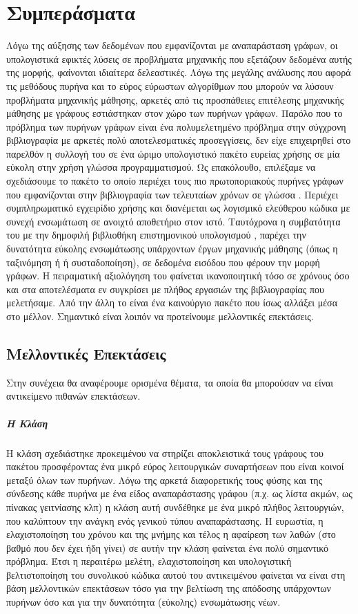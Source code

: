\chapter{Συμπεράσματα}
\label{chap5}
Λόγω της αύξησης των δεδομένων που εμφανίζονται με αναπαράσταση γράφων, οι υπολογιστικά εφικτές λύσεις σε προβλήματα μηχανικής που εξετάζουν δεδομένα αυτής της μορφής, φαίνονται ιδιαίτερα δελεαστικές.
Λόγω της μεγάλης ανάλυσης που αφορά τις μεθόδους πυρήνα και το εύρος εύρωστων αλγορίθμων που μπορούν να λύσουν προβλήματα μηχανικής μάθησης, αρκετές από τις προσπάθειες επιτέλεσης μηχανικής μάθησης με γράφους εστιάστηκαν στον χώρο των πυρήνων γράφων.
Παρόλο που το πρόβλημα των πυρήνων γράφων είναι ένα πολυμελετημένο πρόβλημα στην σύγχρονη βιβλιογραφία με αρκετές πολύ αποτελεσματικές προσεγγίσεις, δεν είχε επιχειρηθεί στο παρελθόν η συλλογή του σε ένα ώριμο υπολογιστικό πακέτο ευρείας χρήσης σε μία εύκολη στην χρήση γλώσσα προγραμματισμού.
Ως επακόλουθο, επιλέξαμε να σχεδιάσουμε το πακέτο  το οποίο περιέχει τους πιο πρωτοποριακούς πυρήνες γράφων που εμφανίζονται στην βιβλιογραφία των τελευταίων χρόνων σε γλώσσα .
Περιέχει συμπληρωματικό εγχειρίδιο χρήσης και διανέμεται ως λογισμικό ελεύθερου κώδικα με συνεχή ενσωμάτωση σε ανοιχτό αποθετήριο στον ιστό.
Ταυτόχρονα η συμβατότητα του με την δημοφιλή βιβλιοθήκη επιστημονικού υπολογισμού , παρέχει την δυνατότητα εύκολης ενσωμάτωσης υπάρχοντων έργων μηχανικής μάθησης (όπως η ταξινόμηση ή ή συσταδοποίηση), σε δεδομένα εισόδου που φέρουν την μορφή γράφων.
Η πειραματική αξιολόγηση του  φαίνεται ικανοποιητική τόσο σε χρόνους όσο και στα αποτελέσματα εν συγκρίσει με πλήθος εργασιών της βιβλιογραφίας που μελετήσαμε.
Από την άλλη το  είναι ένα καινούργιο πακέτο που ίσως αλλάξει μέσα στο μέλλον.
Σημαντικό είναι λοιπόν να προτείνουμε μελλοντικές επεκτάσεις.
\section{Μελλοντικές Επεκτάσεις}
Στην συνέχεια θα αναφέρουμε ορισμένα θέματα, τα οποία θα μπορούσαν να είναι αντικείμενο πιθανών επεκτάσεων.
\paragraph*{Η Κλάση }
Η κλάση  σχεδιάστηκε προκειμένου να στηρίζει αποκλειστικά τους γράφους του πακέτου προσφέροντας ένα μικρό εύρος λειτουργικών συναρτήσεων που είναι κοινοί μεταξύ όλων των πυρήνων.
Λόγω της αρκετά διαφορετικής τους φύσης και της σύνδεσης κάθε πυρήνα με ένα είδος αναπαράστασης γράφου (π.χ. ως λίστα ακμών, ως πίνακας γειτνίασης κλπ) η κλάση αυτή συνδέθηκε με ένα μικρό πλήθος λειτουργιών, που καλύπτουν την ανάγκη ενός γενικού τύπου αναπαράστασης.
Η ευρωστία, η ελαχιστοποίηση του χρόνου και της μνήμης και τέλος η αφαίρεση των λαθών (στο βαθμό που δεν έχει ήδη γίνει) σε αυτήν την κλάση φαίνεται ένα πολύ σημαντικό πρόβλημα.
Έτσι η περαιτέρω μελέτη, ελαχιστοποίηση και υπολογιστική βελτιστοποίηση του συνολικού κώδικα αυτού του αντικειμένου φαίνεται να είναι στη βάση μελλοντικών επεκτάσεων τόσο για την βελτίωση της απόδοσης υπάρχοντων πυρήνων όσο και για την δυνατότητα (εύκολης) ενσωμάτωσης νέων.
